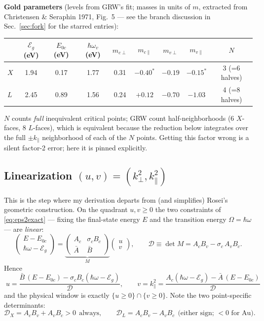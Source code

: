 \documentclass[11pt,a4paper]{article}
\numberwithin{equation}{section}
\newcommand{\hw}{\hbar\omega}
\newcommand{\Eg}{\mathcal{E}_g}
\newcommand{\cD}{\mathcal{D}}
\newcommand{\Ab}{\bar{A}}
\newcommand{\Bb}{\bar{B}}
\newcommand{\kperp}{k_{\perp}}
\newcommand{\kpar}{k_{\parallel}}
\newcommand{\Ezc}{E_{0c}}
\begin{document}
\medskip
\noindent\textbf{Gold parameters} (levels from GRW's fit; masses in
units of $m$, extracted from Christensen \& Seraphin 1971, Fig.~5 ---
see the branch discussion in Sec.~\ref{sec:fork} for the starred
entries):
\begin{center}
\begin{tabular}{lcccccccc}
\toprule
 & $\Eg$ (eV) & $\Ezc$ (eV) & $\hbar\omega_v$ (eV)
 & $m_{c\perp}$ & $m_{c\parallel}$ & $m_{v\perp}$ & $m_{v\parallel}$ & $N$ \\
\midrule
$X$ & 1.94 & 0.17 & 1.77 & 0.31 & $-0.40^{\ast}$ & $-0.19$ & $-0.15^{\ast}$
 & 3 (=6 halves)\\
$L$ & 2.45 & 0.89 & 1.56 & 0.24 & $+0.12$ & $-0.70$ & $-1.03$
 & 4 (=8 halves)\\
\bottomrule
\end{tabular}
\end{center}
$N$ counts \emph{full} inequivalent critical points; GRW count
half-neighborhoods (6 $X$-faces, 8 $L$-faces), which is equivalent
because the reduction below integrates over the full $\pm\kpar$
neighborhood of each of the $N$ points.  Getting this factor wrong is
a silent factor-2 error; here it is pinned explicitly.

\subsection{Linearization $(u,v)=(\kperp^2,\kpar^2)$}

This is the step where my derivation departs from (and simplifies)
Rosei's geometric construction.  On the quadrant
$u,v\ge0$ the two constraints of \eqref{eq:eps2exact} --- fixing the
final-state energy $E$ and the transition energy $\Omega=\hw$ --- are
\emph{linear}:
\begin{equation}
\begin{pmatrix} E-\Ezc\\[2pt] \hw-\Eg\end{pmatrix}
=\underbrace{\begin{pmatrix} A_c & \sigma_cB_c\\[2pt] \Ab & \Bb\end{pmatrix}}_{\textstyle M}
\begin{pmatrix} u\\[2pt] v\end{pmatrix},
\qquad
\cD\equiv\det M=A_cB_v-\sigma_c\,A_vB_c .
\label{eq:linsys}
\end{equation}
Hence
\begin{equation}
\boxed{\;
u=\frac{\Bb\,(E-\Ezc)-\sigma_cB_c(\hw-\Eg)}{\cD},
\qquad
v=\kpar^{2}=\frac{A_c(\hw-\Eg)-\Ab\,(E-\Ezc)}{\cD}
\;}
\label{eq:uv}
\end{equation}
and the physical window is exactly $\{u\ge0\}\cap\{v\ge0\}$.
Note the two point-specific determinants:
\begin{equation}
\cD_X=A_cB_v+A_vB_c>0\ \ \text{always},
\qquad
\cD_L=A_cB_v-A_vB_c\ \ \text{(either sign; $<0$ for Au)} .
\label{eq:Ds}
\end{equation}
\end{document}

